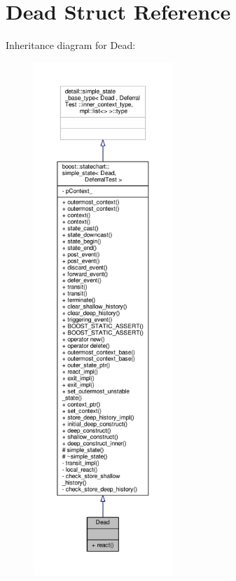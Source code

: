 \hypertarget{struct_dead}{}\section{Dead Struct Reference}
\label{struct_dead}


Inheritance diagram for Dead\+:
\nopagebreak
\begin{figure}[H]
\begin{center}
\leavevmode
\includegraphics[height=550pt]{struct_dead__inherit__graph}
\end{center}
\end{figure}


